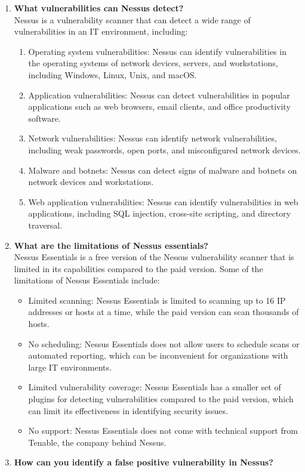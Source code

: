 \documentclass[11pt]{article}
\begin{document}
\begin{enumerate}

    \item \textbf{What vulnerabilities can Nessus detect?}\\

          Nessus is a vulnerability scanner that can detect a wide range of vulnerabilities in an IT environment, including:

          \begin{enumerate}
              \item Operating system vulnerabilities: Nessus can identify vulnerabilities in the operating systems of network devices, servers, and workstations, including Windows, Linux, Unix, and macOS.
              \item Application vulnerabilities: Nessus can detect vulnerabilities in popular applications such as web browsers, email clients, and office productivity software.
              \item Network vulnerabilities: Nessus can identify network vulnerabilities, including weak passwords, open ports, and misconfigured network devices.
              \item Malware and botnets: Nessus can detect signs of malware and botnets on network devices and workstations.
              \item Web application vulnerabilities: Nessus can identify vulnerabilities in web applications, including SQL injection, cross-site scripting, and directory traversal.
          \end{enumerate}
    \item \textbf{What are the limitations of Nessus essentials?}\\

          Nessus Essentials is a free version of the Nessus vulnerability scanner that is limited in its capabilities compared to the paid version. Some of the limitations of Nessus Essentials include:

          \begin{itemize}
              \item Limited scanning: Nessus Essentials is limited to scanning up to 16 IP addresses or hosts at a time, while the paid version can scan thousands of hosts.
              \item No scheduling: Nessus Essentials does not allow users to schedule scans or automated reporting, which can be inconvenient for organizations with large IT environments.
              \item Limited vulnerability coverage: Nessus Essentials has a smaller set of plugins for detecting vulnerabilities compared to the paid version, which can limit its effectiveness in identifying security issues.
              \item No support: Nessus Essentials does not come with technical support from Tenable, the company behind Nessus.
          \end{itemize}
    \item \textbf{How can you identify a false positive vulnerability in Nessus?}\\


\end{enumerate}
\end{document}
